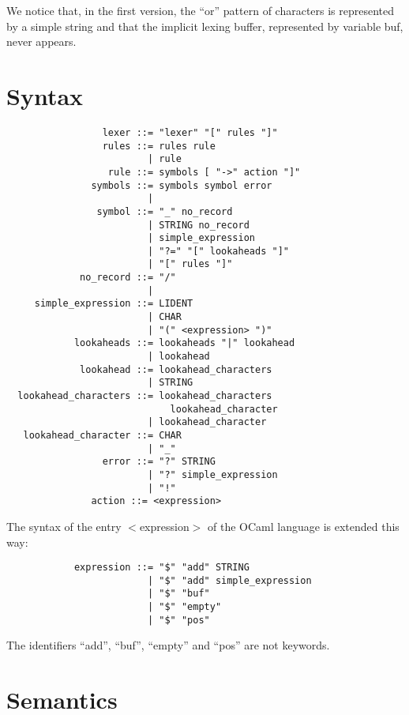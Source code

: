 \documentclass[11pt]{article}
\begin{document}
We notice that, in the first version, the ``or'' pattern of characters
is represented by a simple string and that the implicit lexing buffer,
represented by variable buf, never appears.

\section{Syntax}

\begin{verbatim}
                 lexer ::= "lexer" "[" rules "]"
                 rules ::= rules rule
                         | rule
                  rule ::= symbols [ "->" action "]"
               symbols ::= symbols symbol error
                         |
                symbol ::= "_" no_record
                         | STRING no_record
                         | simple_expression
                         | "?=" "[" lookaheads "]"
                         | "[" rules "]"
             no_record ::= "/"
                         |
     simple_expression ::= LIDENT
                         | CHAR
                         | "(" <expression> ")"
            lookaheads ::= lookaheads "|" lookahead
                         | lookahead
             lookahead ::= lookahead_characters
                         | STRING
  lookahead_characters ::= lookahead_characters
                             lookahead_character
                         | lookahead_character
   lookahead_character ::= CHAR
                         | "_"
                 error ::= "?" STRING
                         | "?" simple_expression
                         | "!"
               action ::= <expression>
\end{verbatim}

The syntax of the entry $<$expression$>$ of the OCaml language is
extended this way:

\begin{verbatim}
            expression ::= "$" "add" STRING
                         | "$" "add" simple_expression
                         | "$" "buf"
                         | "$" "empty"
                         | "$" "pos"
\end{verbatim}

The identifiers ``add'', ``buf'', ``empty'' and ``pos'' are not keywords.

\section{Semantics}
\end{document}
